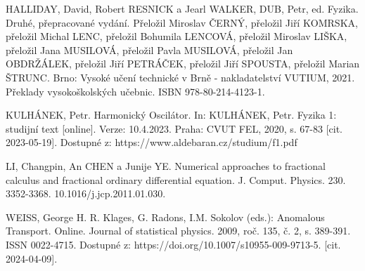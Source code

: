 \documentclass[a4paper,12pt,twoside]{article}
\theoremstyle{definition}
\theoremstyle{remark}
\numberwithin{equation}{section}
\numberwithin{table}{section}
\numberwithin{figure}{section}
\begin{document}
\begin{thebibliography}{12}
 HALLIDAY, David, Robert RESNICK a Jearl WALKER, DUB, Petr, ed. Fyzika. Druhé, přepracované vydání. Přeložil Miroslav ČERNÝ, přeložil Jiří KOMRSKA, přeložil Michal LENC, přeložil Bohumila LENCOVÁ, přeložil Miroslav LIŠKA, přeložil Jana MUSILOVÁ, přeložil Pavla MUSILOVÁ, přeložil Jan OBDRŽÁLEK, přeložil Jiří PETRÁČEK, přeložil Jiří SPOUSTA, přeložil Marian ŠTRUNC. Brno: Vysoké učení technické v Brně - nakladatelství VUTIUM, 2021. Překlady vysokoškolských učebnic. ISBN 978-80-214-4123-1.

 KULHÁNEK, Petr. Harmonický Oscilátor. In: KULHÁNEK, Petr. Fyzika 1: studijní text [online]. Verze: 10.4.2023. Praha: CVUT FEL, 2020, s. 67-83 [cit. 2023-05-19]. Dostupné z: https://www.aldebaran.cz/studium/f1.pdf

 LI, Changpin, An CHEN a Junije YE. Numerical approaches to fractional calculus and fractional ordinary differential equation. J. Comput. Physics. 230. 3352-3368. 10.1016/j.jcp.2011.01.030. 

 WEISS, George H. R. Klages, G. Radons, I.M. Sokolov (eds.): Anomalous Transport. Online. Journal of statistical physics. 2009, roč. 135, č. 2, s. 389-391. ISSN 0022-4715. Dostupné z: https://doi.org/10.1007/s10955-009-9713-5. [cit. 2024-04-09].

\end{thebibliography}
\end{document}
